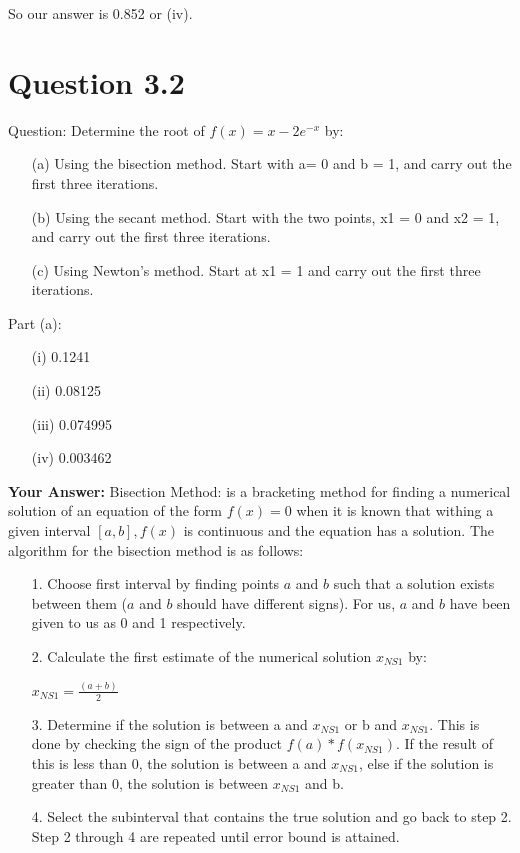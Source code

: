 \documentclass[12pt,a4paper]{report}
\begin{document}
So our answer is 0.852 or (iv).
\newline\section{Question 3.2}
Question: Determine the root of $f(x) = x - 2e^{-x}$ by: 
\begin{itemize}
\item[(a)] Using the bisection method. Start with a= 0 and  b = 1, and carry out the first three iterations.
\item[(b)] Using the secant method. Start with the two points, x1 = 0 and x2 = 1, and carry out the first three iter­ations. 
\item[(c)] Using Newton's method. Start at x1 = 1 and carry out the first three iterations. 
\end{itemize}
Part (a):
\begin{itemize}
\item[(i)] 0.1241
\item[(ii)] 0.08125
\item[(iii)] 0.074995
\item[(iv)] 0.003462
\end{itemize}
\textbf{Your Answer:}
\newline
Bisection Method: is a bracketing method for finding a numerical solution of an equation of the form $f(x) = 0$ when it is known that withing a given interval $[a,b], f(x)$ is continuous and the equation has a solution.
\newline
The algorithm for the bisection method is as follows:
\begin{itemize}
\item[1.] Choose first interval by finding points $a$ and $b$ such that a solution exists between them ($a$ and $b$ should have different signs). For us, $a$ and $b$ have been given to us as 0 and 1 respectively.
\item[2.] Calculate the first estimate of the numerical solution $x_{NS1}$ by:
\begin{center}
$x_{NS1} = \frac{(a+b)}{2}$
\end{center}
\item[3.] Determine if the solution is between a and $x_{NS1}$ or b and $x_{NS1}$. This is done by checking the sign of the product $f(a) * f(x_{NS1})$. If the result of this is less than 0, the solution is between a and $x_{NS1}$, else if the solution is greater than 0, the solution is between $x_{NS1}$ and b.
\item[4.] Select the subinterval that contains the true solution and go back to step 2. Step 2 through 4 are repeated until error bound is attained.
\end{itemize}
\end{document}
